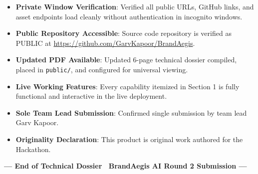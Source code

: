 \documentclass[10pt,a4paper]{article}
\begin{document}
\begin{tcolorbox}[colback=slatebg,colframe=successgreen,arc=1.5mm,boxrule=0.6pt,left=2.5mm,right=2.5mm,top=1.5mm,bottom=1.5mm]
\footnotesize
\begin{itemize}[leftmargin=*,itemsep=1.5pt,topsep=0.5pt]
  \item[\textbf{[\checkmark]}] \textbf{Private Window Verification}: Verified all public URLs, GitHub links, and asset endpoints load cleanly without authentication in incognito windows.
  \item[\textbf{[\checkmark]}] \textbf{Public Repository Accessible}: Source code repository is verified as PUBLIC at \url{https://github.com/GarvKapoor/BrandAegis}.
  \item[\textbf{[\checkmark]}] \textbf{Updated PDF Available}: Updated 6-page technical dossier compiled, placed in \texttt{public/}, and configured for universal viewing.
  \item[\textbf{[\checkmark]}] \textbf{Live Working Features}: Every capability itemized in Section 1 is fully functional and interactive in the live deployment.
  \item[\textbf{[\checkmark]}] \textbf{Sole Team Lead Submission}: Confirmed single submission by team lead Garv Kapoor.
  \item[\textbf{[\checkmark]}] \textbf{Originality Declaration}: This product is original work authored for the Hackathon.
\end{itemize}
\end{tcolorbox}

\begin{center}
\vspace{0.05cm}
\footnotesize\textbf{\color{primarydark}--- End of Technical Dossier \textbar\ BrandAegis AI Round 2 Submission ---}
\end{center}
\end{document}
